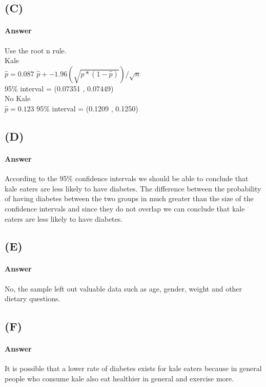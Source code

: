 \documentclass[12pt]{article}
\begin{document}
\subsection*{(C)}

\paragraph{Answer}
Use the root n rule.\\
Kale\\
$\hat{p}= 0.087$
$\hat{p} +- 1.96(\sqrt{\hat{p}*(1-\hat{p})})/\sqrt{n}$\\
95\% interval = (0.07351 , 0.07449)\\
No Kale\\
$\hat{p} = 0.123$
95\% interval = (0.1209 , 0.1250)\\
\subsection*{(D)}

\paragraph{Answer}
According to the 95\% confidence intervals we should be able to conclude that kale eaters are less likely to have diabetes. The difference between the probability of having diabetes between the two groups in much greater than the size of the confidence intervals and since they do not overlap we can conclude that kale eaters are less likely to have diabetes. 

\subsection*{(E)}

\paragraph{Answer}
No, the sample left out valuable data such as age, gender, weight and other dietary questions.

\subsection*{(F)}

\paragraph{Answer}
It is possible that a lower rate of diabetes exists for kale eaters because in general people who consume kale also eat healthier in general and exercise more.
\end{document}
